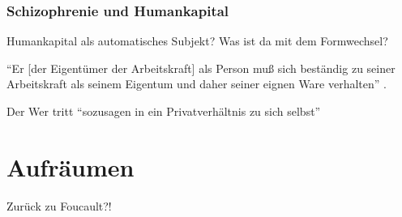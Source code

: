 \documentclass[12pt,
               DIV13,
               paper=a4,
               twoside=false,
               onehalfspacing,
               bibliography=totoc,
               toc=graduated,
               draft,
               ]{scrartcl}
\newcommand{\pc}[2]{\parencite[#1]{#2}}
\begin{document}
\subsubsection{Schizophrenie und Humankapital}

Humankapital als automatisches Subjekt? Was ist da mit dem
Formwechsel?

"`Er [der Eigentümer der Arbeitskraft] als Person muß sich beständig
zu seiner Arbeitskraft als seinem Eigentum und daher seiner eignen
Ware verhalten"' \pc{182}{kap}.

Der Wer tritt "`sozusagen in ein Privatverhältnis zu sich selbst"'
\pc{169}{kap}


\section{Aufräumen}

Zurück zu Foucault?!


\newpage
\nocite{*}
\printshorthands
\printbibliography
\end{document}
